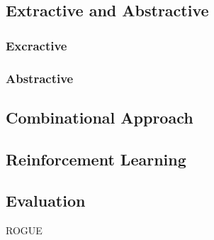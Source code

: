 \subsection{Extractive and Abstractive}
\subsubsection{Excractive}

\subsubsection{Abstractive}

\subsection{Combinational Approach}

\subsection{Reinforcement Learning}

\subsection{Evaluation}
ROGUE